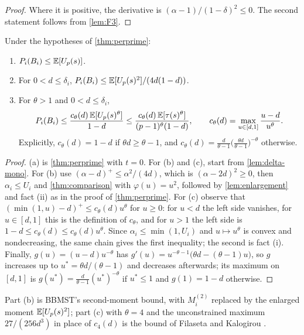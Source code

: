 \begin{proof}
Where it is positive, the derivative is $(\alpha-1)/(1-\delta)^2\le0$. The second statement follows from
\cref{lem:F3}.
\end{proof}

\begin{corollary}\label{cor:variants}
Under the hypotheses of \cref{thm:perprime}:
\begin{enumerate}[label=(\alph*)]
\item $P_i(B_i)\le\mathbb{E}[U_p(s)]$.
\item For $0<d\le\delta_i$, $P_i(B_i)\le\mathbb{E}[U_p(s)^2]/(4d(1-d))$.
\item For $\theta>1$ and $0<d\le\delta_i$,
  \[
    P_i(B_i)\le\frac{c_\theta(d)\,\mathbb{E}[U_p(s)^\theta]}{1-d}\le\frac{c_\theta(d)\,\mathbb{E}[\tau(s)^\theta]}{(p-1)^\theta(1-d)},
    \qquad c_\theta(d)=\max_{u\in[d,1]}\frac{u-d}{u^\theta}.
  \]
  Explicitly, $c_\theta(d)=1-d$ if $\theta d\ge\theta-1$, and
  $c_\theta(d)=\frac{d}{\theta-1}\bigl(\frac{\theta d}{\theta-1}\bigr)^{-\theta}$ otherwise.
\end{enumerate}
\end{corollary}

\begin{proof}
(a) is \cref{thm:perprime} with $t=0$. For (b) and (c), start from \cref{lem:delta-mono}. For (b) use
$(\alpha-d)^+\le\alpha^2/(4d)$, which is $(\alpha-2d)^2\ge0$, then $\alpha_i\le U_i$ and \cref{thm:comparison} with
$\varphi(u)=u^2$, followed by \cref{lem:enlargement} and fact (ii) as in the proof of \cref{thm:perprime}. For (c)
observe that $(\min(1,u)-d)^+\le c_\theta(d)u^\theta$ for $u\ge0$: for $u<d$ the left side vanishes, for
$u\in[d,1]$ this is the definition of $c_\theta$, and for $u>1$ the left side is $1-d\le c_\theta(d)\le
c_\theta(d)u^\theta$. Since $\alpha_i\le\min(1,U_i)$ and $u\mapsto u^\theta$ is convex and nondecreasing, the same
chain gives the first inequality; the second is fact (i). Finally, $g(u)=(u-d)u^{-\theta}$ has
$g'(u)=u^{-\theta-1}\bigl(\theta d-(\theta-1)u\bigr)$, so $g$ increases up to $u^*=\theta d/(\theta-1)$ and decreases
afterwards; its maximum on $[d,1]$ is $g(u^*)=\frac{d}{\theta-1}(u^*)^{-\theta}$ if $u^*\le1$ and $g(1)=1-d$
otherwise.
\end{proof}

Part (b) is BBMST's second-moment bound, with $M_i^{(2)}$ replaced by the enlarged moment $\mathbb{E}[U_p(s)^2]$; part (c)
with $\theta=4$ and the unconstrained maximum $27/(256d^3)$ in place of $c_4(d)$ is the bound of Filaseta and
Kalogirou \cite{FilasetaKalogirou2026}.

